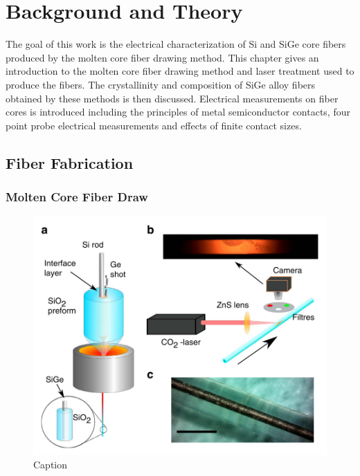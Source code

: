 
\chapter{Background and Theory}

The goal of this work is the electrical characterization of Si and SiGe core fibers produced by the molten core fiber drawing method. This chapter gives an introduction to the molten core fiber drawing method and laser treatment used to produce the fibers. The  crystallinity and composition of SiGe alloy fibers obtained by these methods is then discussed. Electrical measurements on fiber cores is introduced including the principles of metal semiconductor contacts, four point probe electrical measurements and effects of finite contact sizes. %

\section{Fiber Fabrication}
\subsection{Molten Core Fiber Draw}
\begin{figure}[H]
    \centering
    \includegraphics[width=.8\textwidth]{fig/intro-background/MCD.png}
    \caption{Caption\cite{Coucheron2016}}
    \label{MCD}
\end{figure}

